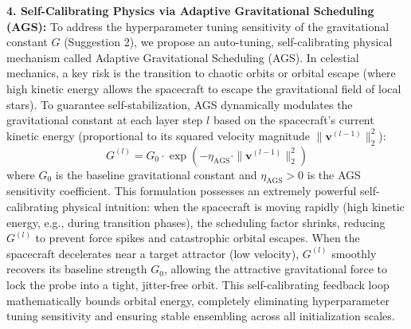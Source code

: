 \textbf{4. Self-Calibrating Physics via Adaptive Gravitational Scheduling (AGS): } To address the hyperparameter tuning sensitivity of the gravitational constant $G$ (Suggestion 2), we propose an auto-tuning, self-calibrating physical mechanism called Adaptive Gravitational Scheduling (AGS). In celestial mechanics, a key risk is the transition to chaotic orbits or orbital escape (where high kinetic energy allows the spacecraft to escape the gravitational field of local stars). To guarantee self-stabilization, AGS dynamically modulates the gravitational constant at each layer step $l$ based on the spacecraft's current kinetic energy (proportional to its squared velocity magnitude $\|\mathbf{v}^{(l-1)}\|_2^2$):
\begin{equation}
    G^{(l)} = G_0 \cdot \exp\left( -\eta_{\text{AGS}} \cdot \|\mathbf{v}^{(l-1)}\|_2^2 \right)
\end{equation}
where $G_0$ is the baseline gravitational constant and $\eta_{\text{AGS}} > 0$ is the AGS sensitivity coefficient. This formulation possesses an extremely powerful self-calibrating physical intuition: when the spacecraft is moving rapidly (high kinetic energy, e.g., during transition phases), the scheduling factor shrinks, reducing $G^{(l)}$ to prevent force spikes and catastrophic orbital escapes. When the spacecraft decelerates near a target attractor (low velocity), $G^{(l)}$ smoothly recovers its baseline strength $G_0$, allowing the attractive gravitational force to lock the probe into a tight, jitter-free orbit. This self-calibrating feedback loop mathematically bounds orbital energy, completely eliminating hyperparameter tuning sensitivity and ensuring stable ensembling across all initialization scales.

